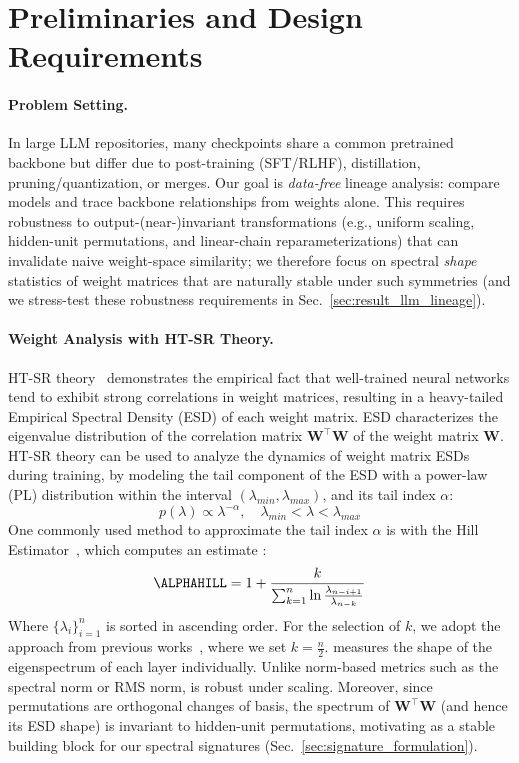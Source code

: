 \section{Preliminaries and Design Requirements}\label{sec:preliminary}

\paragraph{Problem Setting.}
In large LLM repositories, many checkpoints share a common pretrained backbone but differ due to post-training (SFT/RLHF), distillation, pruning/quantization, or merges. Our goal is \emph{data-free} lineage analysis: compare models and trace backbone relationships from weights alone. This requires robustness to output-(near-)invariant transformations (e.g., uniform scaling, hidden-unit permutations, and linear-chain reparameterizations) that can invalidate naive weight-space similarity; we therefore focus on spectral \emph{shape} statistics of weight matrices that are naturally stable under such symmetries (and we stress-test these robustness requirements in Sec.~\ref{sec:result_llm_lineage}).

\paragraph{Weight Analysis with HT-SR Theory.}
HT-SR theory~\citep{martin2021implicit} demonstrates the empirical fact that well-trained neural networks tend to exhibit strong correlations in weight matrices, resulting in a heavy-tailed Empirical Spectral Density (ESD) of each weight matrix. ESD characterizes the eigenvalue distribution of the correlation matrix $\mathbf{W}^{\top}\mathbf{W}$ of the weight matrix $\mathbf{W}$. HT-SR theory can be used to analyze the dynamics of weight matrix ESDs during training, by modeling the tail component of the ESD with a power-law (PL) distribution within the interval $(\lambda_{min}, \lambda_{max})$, and its tail index $\alpha$:
\begin{equation}
    p(\lambda) \propto \lambda^{-\alpha}, \quad \lambda_{min} < \lambda < \lambda_{max}
\end{equation}
One commonly used method to approximate the tail index $\alpha$ is with the Hill Estimator~\citep{hill1975simple}, which computes an estimate \ALPHAHILL:
\begin{equation}
    \text{\ALPHAHILL} = 1 + \frac{k}{\sum_{k=1}^{n}\operatorname{ln}\frac{\lambda_{n-i+1}}{\lambda_{n-k}}}
\end{equation}
Where $\{\lambda_i\}_{i=1}^n$ is sorted in ascending order. For the selection of $k$, we adopt the approach from previous works~\citep{zhou2023temperature, yang2023test}, where we set $k=\frac{n}{2}$. \ALPHAHILL measures the shape of the eigenspectrum of each layer individually. Unlike norm-based metrics such as the spectral norm or RMS norm, \ALPHAHILL is robust under scaling. Moreover, since permutations are orthogonal changes of basis, the spectrum of $\mathbf{W}^{\top}\mathbf{W}$ (and hence its ESD shape) is invariant to hidden-unit permutations, motivating \ALPHAHILL as a stable building block for our spectral signatures (Sec.~\ref{sec:signature_formulation}).

